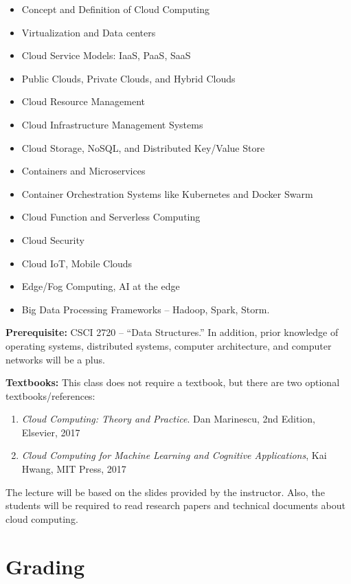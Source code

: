 \documentclass[11pt,letterpaper]{article}
\begin{document}
\begin{itemize}[leftmargin=*]
    \item Concept and Definition of Cloud Computing
    \item Virtualization and Data centers
    \item Cloud Service Models: IaaS, PaaS, SaaS
    \item Public Clouds, Private Clouds, and Hybrid Clouds
    \item Cloud Resource Management
    \item Cloud Infrastructure Management Systems
    \item Cloud Storage, NoSQL, and Distributed Key/Value Store
    \item Containers and Microservices
    \item Container Orchestration Systems like Kubernetes and Docker Swarm
    \item Cloud Function and Serverless Computing
    \item Cloud Security
    \item Cloud IoT, Mobile Clouds
    \item Edge/Fog Computing, AI at the edge
    \item Big Data Processing Frameworks -- Hadoop, Spark, Storm.
\end{itemize}

\textbf{Prerequisite:} CSCI 2720 -- ``Data Structures.'' In addition, prior knowledge of operating systems, distributed systems, computer architecture, and computer networks will be a plus.

\textbf{Textbooks:} This class does not require a textbook, but there are two optional textbooks/references:
\begin{enumerate}
    \item \textit{Cloud Computing: Theory and Practice}. Dan Marinescu, 2nd Edition, Elsevier, 2017
    \item \textit{Cloud Computing for Machine Learning and Cognitive Applications}, Kai Hwang, MIT Press, 2017
\end{enumerate}

The lecture will be based on the slides provided by the instructor. Also, the students will be required to read research papers and technical documents about cloud computing.

\section{Grading}
\end{document}
